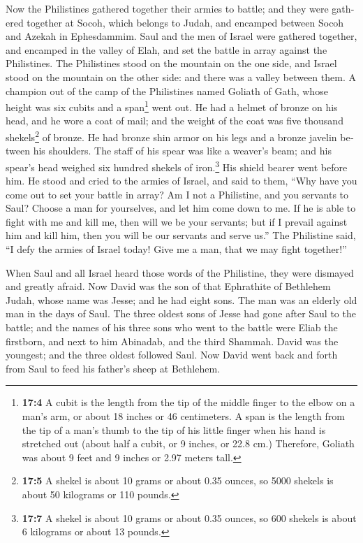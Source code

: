 \begin{paracol}{2}
\begin{otherlanguage}{english}
 Now the Philistines gathered together their armies to
battle; and they were gathered together at Socoh, which belongs to
Judah, and encamped between Socoh and Azekah in Ephesdammim.
 Saul and the men of Israel were gathered together, and
encamped in the valley of Elah, and set the battle in array against the
Philistines.  The Philistines stood on the mountain on the
one side, and Israel stood on the mountain on the other side: and there
was a valley between them.  A champion out of the camp of
the Philistines named Goliath of Gath, whose height was six cubits and a
span\footnote{\textbf{17:4} A cubit is the length from the tip of the
  middle finger to the elbow on a man's arm, or about 18 inches or 46
  centimeters. A span is the length from the tip of a man's thumb to the
  tip of his little finger when his hand is stretched out (about half a
  cubit, or 9 inches, or 22.8 cm.) Therefore, Goliath was about 9 feet
  and 9 inches or 2.97 meters tall.} went out.  He had a
helmet of bronze on his head, and he wore a coat of mail; and the weight
of the coat was five thousand shekels\footnote{\textbf{17:5} A shekel is
  about 10 grams or about 0.35 ounces, so 5000 shekels is about 50
  kilograms or 110 pounds.} of bronze.  He had bronze shin
armor on his legs and a bronze javelin between his shoulders.
 The staff of his spear was like a weaver's beam; and his
spear's head weighed six hundred shekels of iron.\footnote{\textbf{17:7}
  A shekel is about 10 grams or about 0.35 ounces, so 600 shekels is
  about 6 kilograms or about 13 pounds.} His shield bearer went before
him.  He stood and cried to the armies of Israel, and said
to them, ``Why have you come out to set your battle in array? Am I not a
Philistine, and you servants to Saul? Choose a man for yourselves, and
let him come down to me.  If he is able to fight with me
and kill me, then will we be your servants; but if I prevail against him
and kill him, then you will be our servants and serve us.''
 The Philistine said, ``I defy the armies of Israel
today! Give me a man, that we may fight together!''

 When Saul and all Israel heard those words of the
Philistine, they were dismayed and greatly afraid.  Now
David was the son of that Ephrathite of Bethlehem Judah, whose name was
Jesse; and he had eight sons. The man was an elderly old man in the days
of Saul.  The three oldest sons of Jesse had gone after
Saul to the battle; and the names of his three sons who went to the
battle were Eliab the firstborn, and next to him Abinadab, and the third
Shammah.  David was the youngest; and the three oldest
followed Saul.  Now David went back and forth from Saul
to feed his father's sheep at Bethlehem.


\end{otherlanguage}
\end{paracol}
